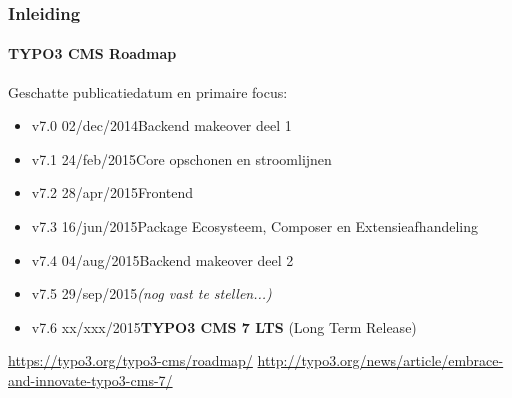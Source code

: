 \begin{frame}[fragile]
	\frametitle{Inleiding}
	\framesubtitle{TYPO3 CMS Roadmap}

	Geschatte publicatiedatum en primaire focus:

	\begin{itemize}
		\item v7.0 \tabto{1.0cm}02/dec/2014\tabto{3.4cm}Backend makeover deel 1
		\item v7.1 \tabto{1.0cm}24/feb/2015\tabto{3.4cm}Core opschonen en stroomlijnen
		\item v7.2 \tabto{1.0cm}28/apr/2015\tabto{3.4cm}Frontend

		\item
			\begingroup
				\color{typo3orange}
					v7.3 \tabto{1.0cm}16/jun/2015\tabto{3.4cm}Package Ecosysteem, Composer\newline
					\tabto{3.4cm}en Extensieafhandeling
			\endgroup

		\item v7.4 \tabto{1.0cm}04/aug/2015\tabto{3.4cm}Backend makeover deel 2
		\item v7.5 \tabto{1.0cm}29/sep/2015\tabto{3.4cm}\textit{(nog vast te stellen...)}
		\item v7.6 \tabto{1.0cm}xx/xxx/2015\tabto{3.4cm}\textbf{TYPO3 CMS 7 LTS} (Long Term Release)
	\end{itemize}

	\smaller
		\url{https://typo3.org/typo3-cms/roadmap/}\newline
		\url{http://typo3.org/news/article/embrace-and-innovate-typo3-cms-7/}
	\normalsize

\end{frame}

